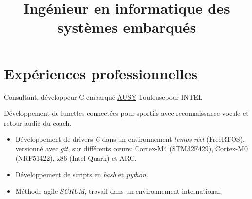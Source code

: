 \documentclass[10pt,a4paper,sans]{moderncv}
\title{Ingénieur en informatique des systèmes embarqués} %
\begin{document}
\makecvtitle

\section{Expériences professionnelles}
	{Consultant, développeur C embarqué}
	{\href{http://www.ausy.fr/}{AUSY}}
	{Toulouse}{pour INTEL}
	{Développement de lunettes connectées pour sportifs avec reconnaissance vocale et retour audio du coach.
\begin{addmargin}[1em]{1em}%
\begin{itemize}
\item Développement de drivers \emph{C} dans un environnement \emph{temps réel} (FreeRTOS), versionné avec \emph{git}, sur différents cœurs: Cortex-M4 (STM32F429), Cortex-M0 (NRF51422), x86 (Intel Quark) et ARC.
\item Développement de scripts en \emph{bash} et \emph{python}.
\item Méthode agile \emph{SCRUM}, travail dans un environnement international.
\end{itemize}
\end{addmargin}
}

\end{document}
